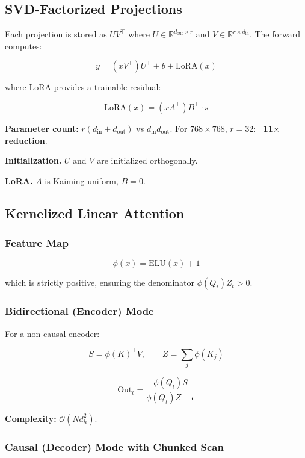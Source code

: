 \subsection{SVD-Factorized Projections}

Each projection is stored as $U V^\top$ where $U \in \mathbb{R}^{d_\text{out} \times r}$ 
and $V \in \mathbb{R}^{r \times d_\text{in}}$. The forward computes:

\[
y = (x V^\top) U^\top + b + \text{LoRA}(x)
\tag{4.1}
\]

where LoRA provides a trainable residual:

\[
\text{LoRA}(x) = (x A^\top) B^\top \cdot s
\tag{4.2}
\]

\textbf{Parameter count:} $r(d_\text{in} + d_\text{out})$ vs $d_\text{in} d_\text{out}$. 
For $768 \times 768$, $r = 32$: \textbf{~11$\times$ reduction}.

\textbf{Initialization.} $U$ and $V$ are initialized orthogonally.

\textbf{LoRA.} $A$ is Kaiming-uniform, $B = 0$.

\subsection{Kernelized Linear Attention}

\subsubsection{Feature Map}

\[
\phi(x) = \text{ELU}(x) + 1
\tag{4.3}
\]

which is strictly positive, ensuring the denominator $\phi(Q_t) Z_t > 0$.

\subsubsection{Bidirectional (Encoder) Mode}

For a non-causal encoder:

\[
S = \phi(K)^\top V, \qquad
Z = \sum_j \phi(K_j)
\tag{4.4}
\]

\[
\text{Out}_t = \frac{\phi(Q_t) S}{\phi(Q_t) Z + \epsilon}
\tag{4.5}
\]

\textbf{Complexity:} $\mathcal{O}(N d_h^2)$.

\subsubsection{Causal (Decoder) Mode with Chunked Scan}

